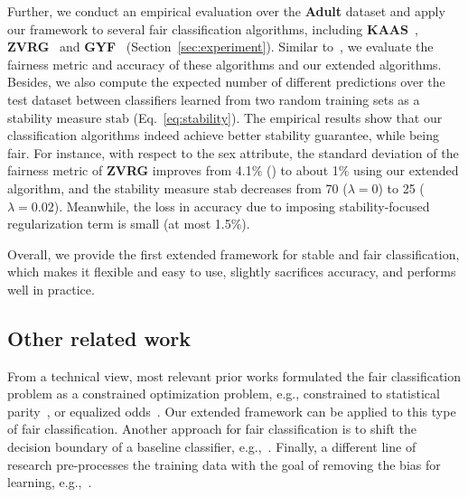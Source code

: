 \documentclass[11pt]{article}
\begin{document}
	Further, we conduct an empirical evaluation over the \textbf{Adult} dataset and apply our framework to several fair classification algorithms, including \textbf{KAAS}~\cite{kamishima2012fairness},  \textbf{ZVRG}~\cite{zafar2017fair} and \textbf{GYF}~\cite{goel2018non} (Section~\ref{sec:experiment}).
	Similar to~\cite{friedler2018comparative}, we evaluate the fairness metric and accuracy of these algorithms and our extended algorithms.
	Besides, we also compute the expected number of different predictions over the test dataset between classifiers learned from two random training sets as a stability measure $\mathrm{stab}$ (Eq.~\eqref{eq:stability}).
	The empirical results show that our classification algorithms indeed achieve better stability guarantee, while being fair. 
	For instance, with respect to the sex attribute, the standard deviation of the fairness metric of \textbf{ZVRG} improves from 4.1$\%$ (\cite{friedler2018comparative}) to about 1$\%$ using our extended algorithm, and the stability measure $\mathrm{stab}$ decreases from 70 ($\lambda=0$) to 25 ($\lambda=0.02$).
	Meanwhile, the loss in accuracy due to imposing stability-focused regularization term is small (at most 1.5$\%$).
	
	
	Overall, we provide the first extended framework for stable and fair classification, which makes it flexible and easy to use, slightly sacrifices accuracy, and performs well in practice.
	
	\subsection{Other related work}
	\label{subsec:related}
	
	From a technical view,  most relevant prior works formulated the fair classification problem as a constrained optimization problem, e.g., constrained to statistical parity~\cite{zafar2017fairness,menon2018the,goel2018non,celis2018classification}, or equalized odds~\cite{hardt2016equality,zafar2017fair,menon2018the,celis2018classification}.
	Our extended framework can be applied to this type of fair classification.
	Another approach for fair classification is to shift the decision boundary of a baseline classifier, e.g.,~\cite{fish2016confidence,hardt2016equality,goh2016satisfying,pleiss2017on, woodworth2017learning,dwork2018decoupled}.
	Finally, a different line of research pre-processes the training data with the goal of removing the bias for learning, e.g.,~\cite{kamiran2009classifying,luong2011k,kamiran2012data,zemel2013learning,feldman2015certifying,krasanakis2018adaptive}.
	
\end{document}
